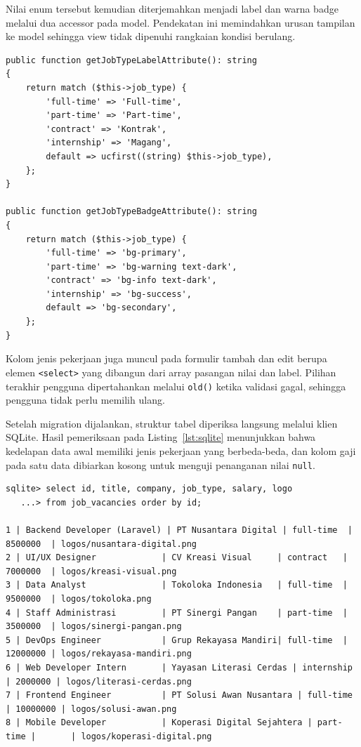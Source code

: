 \documentclass[12pt,a4paper]{article}
\begin{document}
Nilai enum tersebut kemudian diterjemahkan menjadi label dan warna badge melalui dua accessor pada model. Pendekatan ini memindahkan urusan tampilan ke model sehingga view tidak dipenuhi rangkaian kondisi berulang.

\begin{lstlisting}[caption={Accessor label dan badge jenis pekerjaan pada \texttt{JobVacancy}}, label={lst:accessor}]
public function getJobTypeLabelAttribute(): string
{
    return match ($this->job_type) {
        'full-time' => 'Full-time',
        'part-time' => 'Part-time',
        'contract' => 'Kontrak',
        'internship' => 'Magang',
        default => ucfirst((string) $this->job_type),
    };
}

public function getJobTypeBadgeAttribute(): string
{
    return match ($this->job_type) {
        'full-time' => 'bg-primary',
        'part-time' => 'bg-warning text-dark',
        'contract' => 'bg-info text-dark',
        'internship' => 'bg-success',
        default => 'bg-secondary',
    };
}
\end{lstlisting}

Kolom jenis pekerjaan juga muncul pada formulir tambah dan edit berupa elemen \texttt{<select>} yang dibangun dari array pasangan nilai dan label. Pilihan terakhir pengguna dipertahankan melalui \texttt{old()} ketika validasi gagal, sehingga pengguna tidak perlu memilih ulang.

Setelah migration dijalankan, struktur tabel diperiksa langsung melalui klien SQLite. Hasil pemeriksaan pada Listing~\ref{lst:sqlite} menunjukkan bahwa kedelapan data awal memiliki jenis pekerjaan yang berbeda-beda, dan kolom gaji pada satu data dibiarkan kosong untuk menguji penanganan nilai \texttt{null}.

\begin{lstlisting}[caption={Hasil pemeriksaan isi tabel \texttt{job\_vacancies} melalui sqlite3}, label={lst:sqlite}, language={}]
sqlite> select id, title, company, job_type, salary, logo
   ...> from job_vacancies order by id;

1 | Backend Developer (Laravel) | PT Nusantara Digital | full-time  | 8500000  | logos/nusantara-digital.png
2 | UI/UX Designer             | CV Kreasi Visual     | contract   | 7000000  | logos/kreasi-visual.png
3 | Data Analyst               | Tokoloka Indonesia   | full-time  | 9500000  | logos/tokoloka.png
4 | Staff Administrasi         | PT Sinergi Pangan    | part-time  | 3500000  | logos/sinergi-pangan.png
5 | DevOps Engineer            | Grup Rekayasa Mandiri| full-time  | 12000000 | logos/rekayasa-mandiri.png
6 | Web Developer Intern       | Yayasan Literasi Cerdas | internship | 2000000 | logos/literasi-cerdas.png
7 | Frontend Engineer          | PT Solusi Awan Nusantara | full-time | 10000000 | logos/solusi-awan.png
8 | Mobile Developer           | Koperasi Digital Sejahtera | part-time |       | logos/koperasi-digital.png
\end{lstlisting}
\end{document}
